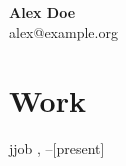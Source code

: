 \documentclass{resume}
\begin{document}
{\bfseries\LARGE Alex Doe}\\
alex@example.org

\section*{Work}

\begin{foreach}{j}{job}
  \textbf{}, 
    \hfill {}--[present]
  \begin{itemize}  \end{itemize}
\end{foreach}
\end{document}
